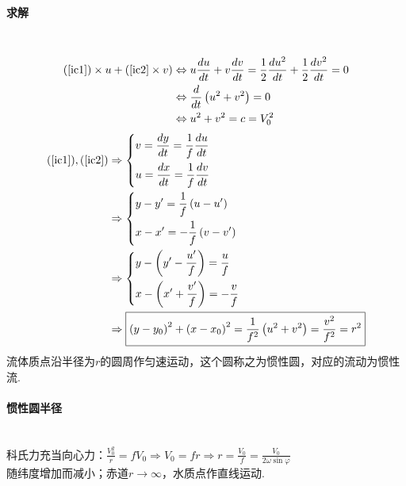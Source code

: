 \documentclass[a4paper,12pt]{article}
\begin{document}
    \paragraph{求解}~{}
    \[
        \begin{aligned}
            (\ref{ic1})\times u+(\ref{ic2}\times v)&\Leftrightarrow u \frac{d u}{d t}+v \frac{d v}{d t}=\frac{1}{2} \frac{d u^{2}}{d t}+\frac{1}{2} \frac{d v^{2}}{d t}=0 \\
            &\Leftrightarrow \frac{d}{d t}\left(u^{2}+v^{2}\right)=0\\
            &\Leftrightarrow u^{2}+v^{2}=c=V_{0}^{2}
        \end{aligned}
    \]
    \[
        \begin{aligned}
            (\ref{ic1}),(\ref{ic2})
            &\Rightarrow
            \left\{\begin{aligned}&v=\frac{d y}{d t}=\frac{1}{f} \frac{d u}{d t}\\ &u=\frac{d x}{d t}=\frac{1}{f} \frac{d v}{d t}\end{aligned}\right.\\
            &\Rightarrow
            \left\{\begin{aligned}&y-y^{\prime}=\frac{1}{f}\left(u-u^{\prime}\right)\\ &x-x^{\prime}=-\frac{1}{f}\left(v-v^{\prime}\right)\end{aligned}\right.\\
            &\Rightarrow
            \left\{\begin{aligned}&y-\left(y^{\prime}-\frac{u^{\prime}}{f}\right)=\frac{u}{f}\\ &x-\left(x^{\prime}+\frac{v^{\prime}}{f}\right)=-\frac{v}{f}\end{aligned}\right.\\
            &\Rightarrow\boxed{\left(y-y_{0}\right)^{2}+\left(x-x_{0}\right)^{2}=\frac{1}{f^{2}}\left(u^{2}+v^{2}\right)=\frac{v^{2}}{f^{2}}=r^{2}}
        \end{aligned}
    \]
    流体质点沿半径为$r$的圆周作匀速运动，这个圆称之为惯性圆，对应的流动为惯性流.
    \paragraph{惯性圆半径}~{}\\
    科氏力充当向心力：$\displaystyle \frac{V_0^2}{r}=fV_0\Rightarrow V_0=fr\Rightarrow r=\frac{V_0}{f}=\frac{V_0}{2\omega \sin \varphi}$\\
    随纬度增加而减小；赤道$r\rightarrow\infty$，水质点作直线运动.
\end{document}
